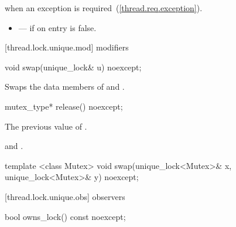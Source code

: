 \begin{itemdescr}
\pnum\effects {}

\pnum\postcondition {}

\pnum\throws {} when
an exception is required~(\ref{thread.req.exception}).

\pnum \errors
\begin{itemize}
\item {} --- if on entry  is false.
\end{itemize}
\end{itemdescr}

[thread.lock.unique.mod]{ modifiers}

%
%
\begin{itemdecl}
void swap(unique_lock& u) noexcept;
\end{itemdecl}

\begin{itemdescr}
\pnum\effects Swaps the data members of  and .
\end{itemdescr}

%
%
\begin{itemdecl}
mutex_type* release() noexcept;
\end{itemdecl}

\begin{itemdescr}
\pnum\returns The previous value of .

\pnum\postconditions {} and .
\end{itemdescr}

%
%
\begin{itemdecl}
template <class Mutex>
  void swap(unique_lock<Mutex>& x, unique_lock<Mutex>& y) noexcept;
\end{itemdecl}

\begin{itemdescr}
\pnum\effects {}
\end{itemdescr}

[thread.lock.unique.obs]{ observers}

%
%
\begin{itemdecl}
bool owns_lock() const noexcept;
\end{itemdecl}

